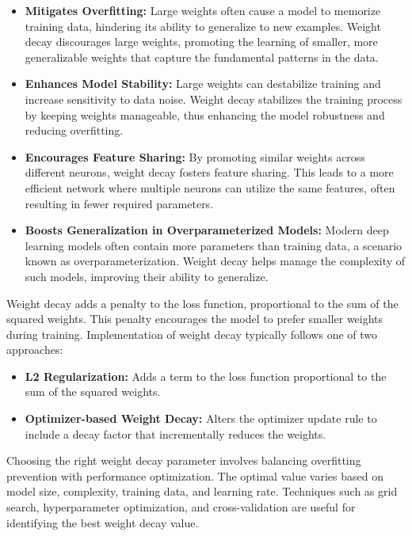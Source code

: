 \documentclass[12pt,a4paper]{report}
\begin{document}
\begin{itemize}
  \item \textbf{Mitigates Overfitting:} Large weights often cause a model to memorize training data, hindering its ability to generalize to new examples. Weight decay discourages large weights, promoting the learning of smaller, more generalizable weights that capture the fundamental patterns in the data.

  \item \textbf{Enhances Model Stability:} Large weights can destabilize training and increase sensitivity to data noise. Weight decay stabilizes the training process by keeping weights manageable, thus enhancing the model robustness and reducing overfitting.

  \item \textbf{Encourages Feature Sharing:} By promoting similar weights across different neurons, weight decay fosters feature sharing. This leads to a more efficient network where multiple neurons can utilize the same features, often resulting in fewer required parameters.

  \item \textbf{Boosts Generalization in Overparameterized Models:} Modern deep learning models often contain more parameters than training data, a scenario known as overparameterization. Weight decay helps manage the complexity of such models, improving their ability to generalize.
\end{itemize}

Weight decay adds a penalty to the loss function, proportional to the sum of the squared weights. This penalty encourages the model to prefer smaller weights during training. Implementation of weight decay typically follows one of two approaches:

\begin{itemize}
  \item \textbf{L2 Regularization:} Adds a term to the loss function proportional to the sum of the squared weights.
  \item \textbf{Optimizer-based Weight Decay:} Alters the optimizer update rule to include a decay factor that incrementally reduces the weights.
\end{itemize}

Choosing the right weight decay parameter involves balancing overfitting prevention with performance optimization. The optimal value varies based on model size, complexity, training data, and learning rate. Techniques such as grid search, hyperparameter optimization, and cross-validation are useful for identifying the best weight decay value.
\end{document}
